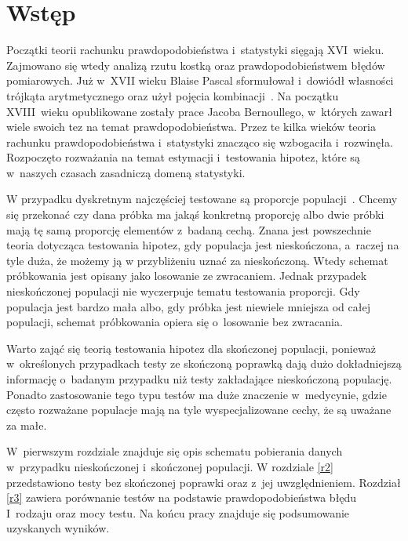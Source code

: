 \chapter*{Wstęp}
Początki teorii rachunku prawdopodobieństwa i~statystyki sięgają XVI~wieku. Zajmowano się wtedy analizą rzutu kostką oraz prawdopodobieństwem błędów pomiarowych. Już w~XVII wieku Blaise Pascal sformułował i~dowiódł własności trójkąta arytmetycznego oraz użył pojęcia kombinacji~\cite{Hald2003}. Na początku XVIII~wieku opublikowane zostały prace Jacoba Bernoullego, w~których zawarł wiele swoich tez na temat prawdopodobieństwa. Przez te kilka wieków teoria rachunku prawdopodobieństwa i~statystyki znacząco się wzbogaciła i~rozwinęła. Rozpoczęto rozważania na temat estymacji i~testowania hipotez, które są w~naszych czasach zasadniczą domeną statystyki.

W przypadku dyskretnym najczęściej testowane są proporcje populacji~\cite{Lehmann1968}. Chcemy się przekonać czy dana próbka ma jakąś konkretną proporcję albo dwie próbki mają tę samą proporcję elementów z~badaną cechą. Znana jest powszechnie teoria dotycząca testowania hipotez, gdy populacja jest nieskończona, a~raczej na tyle duża, że możemy ją w przybliżeniu uznać za nieskończoną. Wtedy schemat próbkowania jest opisany jako losowanie ze zwracaniem. Jednak przypadek nieskończonej populacji nie wyczerpuje tematu testowania proporcji. Gdy populacja jest bardzo mała albo, gdy próbka jest niewiele mniejsza od całej populacji, schemat próbkowania opiera się o~losowanie bez zwracania. 

Warto zająć się teorią testowania hipotez dla skończonej populacji, ponieważ w~określonych przypadkach testy ze skończoną poprawką dają dużo dokładniejszą informację o~badanym przypadku niż testy zakładające nieskończoną populację. Ponadto zastosowanie tego typu testów ma duże znaczenie w~medycynie, gdzie często rozważane populacje mają na tyle wyspecjalizowane cechy, że są uważane za małe.

W~pierwszym rozdziale znajduje się opis schematu pobierania danych w~przypadku nieskończonej i~skończonej populacji. W rozdziale \ref{r2} przedstawiono testy bez skończonej poprawki oraz z~jej uwzględnieniem. Rozdział \ref{r3} zawiera porównanie testów na podstawie prawdopodobieństwa błędu I~rodzaju oraz mocy testu. Na końcu pracy znajduje się podsumowanie uzyskanych wyników.